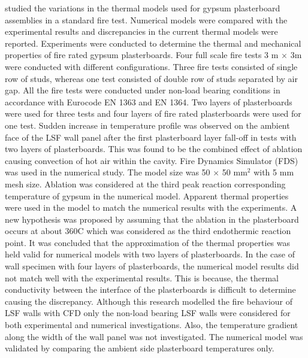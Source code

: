 \citet{Lazaro2016} studied the variations in the thermal models used for gypsum plasterboard assemblies in a standard fire test. Numerical models were compared with the experimental results and discrepancies in the current thermal models were reported. Experiments were conducted to determine the thermal and mechanical properties of fire rated gypsum plasterboards. Four full scale fire tests 3 m \(\times\) 3m were conducted with different configurations. Three fire tests consisted of single row of studs, whereas one test consisted of double row of studs separated by air gap. All the fire tests were conducted under non-load bearing conditions in accordance with Eurocode EN 1363 and EN 1364. Two layers of plasterboards were used for three tests and four layers of fire rated plasterboards were used for one test. Sudden increase in temperature profile was observed on the ambient face of the LSF wall panel after the first plasterboard layer fall-off in tests with two layers of plasterboards. This was found to be the combined effect of ablation causing convection of hot air within the cavity. Fire Dynamics Simulator (FDS) was used in the numerical study. The model size was 50 \(\times\) 50 mm\(^2\) with 5 mm mesh size. Ablation was considered at the third peak reaction corresponding temperature of gypsum in the numerical model. Apparent thermal properties were used in the model to match the numerical results with the experiments. A new hypothesis was proposed by assuming that the ablation in the plasterboard occurs at about 360\degree C which was considered as the third endothermic reaction point. It was concluded that the approximation of the thermal properties was held valid for numerical models with two layers of plasterboards. In the case of wall specimen with four layers of plasterboards, the numerical model results did not match well with the experimental results. This is because, the thermal conductivity between the interface of the plasterboards is difficult to determine causing the discrepancy. Although this research modelled the fire behaviour of LSF walls with CFD only the non-load bearing LSF walls were considered for both experimental and numerical investigations. Also, the temperature gradient along the width of the wall panel was not investigated. The numerical model was validated by comparing the ambient side plasterboard temperatures only.

